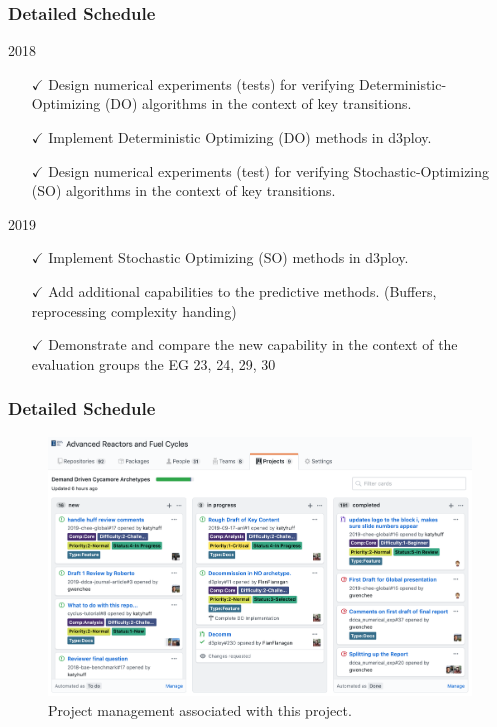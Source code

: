 \begin{frame}
        \frametitle{Detailed Schedule}
\begin{block}{2018}
        \begin{itemize}
       \item[$\checkmark$] Design numerical experiments (tests) for verifying Deterministic-Optimizing (DO) algorithms in the context of key transitions.
       \item[$\checkmark$] Implement Deterministic Optimizing (DO) methods in d3ploy.
       \item[$\checkmark$] Design numerical experiments (test) for verifying Stochastic-Optimizing (SO) algorithms in the context of key transitions. 
        \end{itemize}
\end{block}
\begin{block}{2019}
        \begin{itemize}
       \item[$\checkmark$] Implement Stochastic Optimizing (SO) methods in d3ploy.
       \item[$\checkmark$] Add additional capabilities to the predictive methods. (Buffers, reprocessing complexity handing)
       \item[$\checkmark$] Demonstrate and compare the new capability in the context of the evaluation groups the EG 23, 24, 29, 30
        \end{itemize}
\end{block}
\end{frame}


\begin{frame}
        \frametitle{Detailed Schedule}
    \begin{figure}[htbp!]
        \begin{center}
          \includegraphics[width=\textwidth]{images/github-ddca-proj.png}
        \end{center}
              \caption{Project management associated with this project.}
      \end{figure}
\end{frame}

